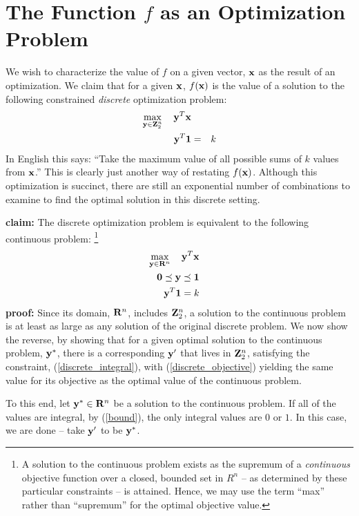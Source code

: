 \documentclass[12pt]{article}
\begin{document}
\section{The Function $f$ as an Optimization Problem}
We wish to characterize the value of $f$ on a given vector, ${\bf x}$ as 
the result of an optimization.
We claim that for a given ${\bf x}$, $f({\bf x})$ is the value of 
a solution to the following constrained {\em discrete\/} optimization problem:%
\begin{eqnarray}
	\mathop{\rm max}_{{\bf y} \in {\bf Z}_2^n}\limits \quad {\bf y}^T {\bf x} && \label{discrete_objective} \\
{\bf y}^T {\bf 1} & = & k \label{discrete_integral} 
\end{eqnarray}
In English this says: ``Take the maximum value of all possible sums of $k$ 
values from ${\bf x}$.'' This is clearly just another way of restating $f({\bf x})$.
Although this optimization is succinct, there are still an exponential number 
of combinations to examine to find the optimal solution in this discrete setting.

{\bf claim:} The discrete optimization problem is equivalent to the following continuous problem:%
\footnote{%
A solution to the continuous problem exists as the supremum of a {\it continuous\/}
objective function over a closed, bounded set in $R^n$ -- 
as determined by these particular constraints -- is attained. Hence,
we may use the term ``max'' rather than ``supremum'' for the optimal
objective value.
}
\begin{eqnarray}
\mathop{\rm max}_{{\bf y} \in {\bf R}^n}\limits \quad {\bf y}^T {\bf x} &&  \\
{\bf 0} \preceq {\bf y}   \preceq  {\bf 1}&& \label{bound} \\ 
{\bf y}^T {\bf 1}  =  k && \label{integral} 
\end{eqnarray}
{\bf proof:}
Since its domain, ${\bf R}^n$, 
includes ${\bf Z}_2^n$, a solution to the continuous problem is at least as 
large as any solution of the original discrete problem.
We now show the reverse, by showing that for a given optimal solution to the 
continuous problem, ${\bf y}^*$, there is a corresponding ${\bf y}^\prime$ that 
lives in ${\bf Z}_2^n$, satisfying the constraint, (\ref{discrete_integral}), 
with (\ref{discrete_objective}) yielding the same value for its objective 
as the optimal value of the continuous problem.

To this end, let ${\bf y}^* \in {\bf R}^n$ be a solution to the continuous 
problem. If all of the values are integral, by (\ref{bound}), 
the only integral values are $0$ or $1$. In this case, we are done -- take 
${\bf y}^\prime$ to be ${\bf y}^*$.
\end{document}
